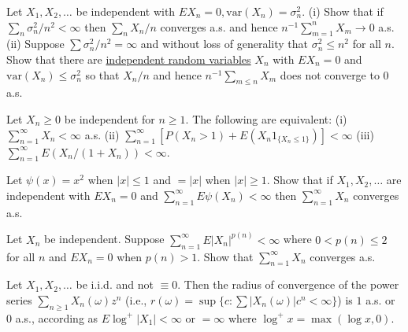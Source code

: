   \begin{exercise}[Durrett 2.5.4]
    Let $X_1, X_2, \dots$ be independent with $EX_n = 0, \text{var}(X_n) = \sigma_n^2$. (i) Show that if $\sum_n \sigma_n^2/n^2 < \infty$ then $\sum_n X_n/n$ converges a.s. and hence $n^{-1} \sum_{m=1}^n X_m \to 0$ a.s. (ii) Suppose $\sum \sigma_n^2/n^2 = \infty$ and without loss of generality that $\sigma_n^2 \leq n^2$ for all $n$. Show that there are \hyperref[def:independent-random-variables]{independent random variables} $X_n$ with $EX_n = 0$ and $\text{var}(X_n) \leq \sigma_n^2$ so that $X_n/n$ and hence $n^{-1} \sum_{m \leq n} X_m$ does not converge to 0 a.s.
  \end{exercise}
  \begin{solution}

  \end{solution}

  \begin{exercise}[Durrett 2.5.5]
    Let $X_n \geq 0$ be independent for $n \geq 1$. The following are equivalent: (i) $\sum_{n=1}^{\infty} X_n < \infty$ a.s. (ii) $\sum_{n=1}^{\infty} [P(X_n > 1) + E(X_n 1_{\{X_n \leq 1\}})] < \infty$ (iii) $\sum_{n=1}^{\infty} E(X_n/(1 + X_n)) < \infty$.
  \end{exercise}
  \begin{solution}

  \end{solution}

  \begin{exercise}[Durrett 2.5.6]
    Let $\psi(x) = x^2$ when $|x| \leq 1$ and $= |x|$ when $|x| \geq 1$. Show that if $X_1, X_2, \dots$ are independent with $EX_n = 0$ and $\sum_{n=1}^{\infty} E\psi(X_n) < \infty$ then $\sum_{n=1}^{\infty} X_n$ converges a.s.
  \end{exercise}
  \begin{solution}

  \end{solution}

  \begin{exercise}[Durrett 2.5.7]
    Let $X_n$ be independent. Suppose $\sum_{n=1}^{\infty} E|X_n|^{p(n)} < \infty$ where $0 < p(n) \leq 2$ for all $n$ and $EX_n = 0$ when $p(n) > 1$. Show that $\sum_{n=1}^{\infty} X_n$ converges a.s.
  \end{exercise}
  \begin{solution}

  \end{solution}

  \begin{exercise}[Durrett 2.5.8]
    Let $X_1, X_2, \dots$ be i.i.d. and not $\equiv 0$. Then the radius of convergence of the power series $\sum_{n \geq 1} X_n(\omega)z^n$ (i.e., $r(\omega) = \sup\{c : \sum |X_n(\omega)|c^n < \infty \}$) is $1$ a.s. or $0$ a.s., according as $E \log^+ |X_1| < \infty$ or $= \infty$ where $\log^+ x = \max(\log x, 0)$.
  \end{exercise}
  \begin{solution}

  \end{solution}

